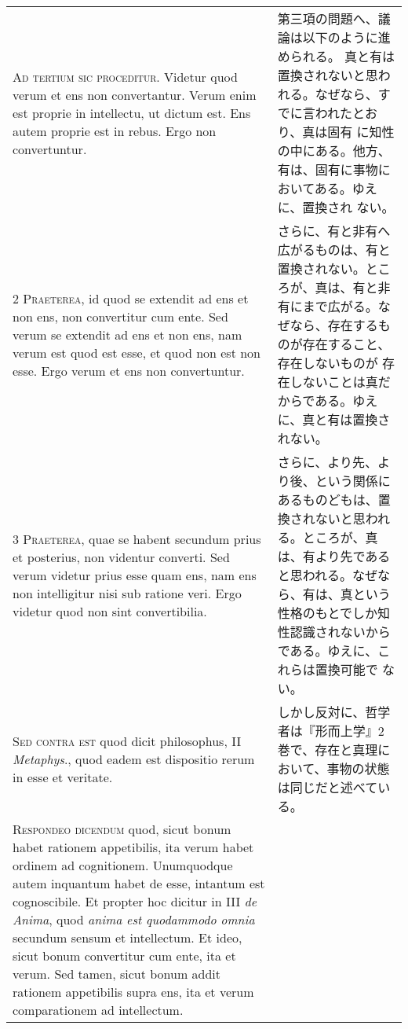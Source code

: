 \documentclass[10pt]{jsarticle} %
\begin{document}
\begin{longtable}{p{21em}p{21em}}



{\huge A}{\scshape d tertium sic proceditur}. Videtur quod verum et ens
non convertantur. Verum enim est proprie in intellectu, ut dictum
est. Ens autem proprie est in rebus. Ergo non convertuntur.

&

第三項の問題へ、議論は以下のように進められる。
真と有は置換されないと思われる。なぜなら、すでに言われたとおり、真は固有
 に知性の中にある。他方、有は、固有に事物においてある。ゆえに、置換され
 ない。

\\


{\scshape 2 Praeterea}, id quod se extendit ad ens et non ens, non
 convertitur cum ente. Sed verum se extendit ad ens et non ens, nam
 verum est quod est esse, et quod non est non esse. Ergo verum et ens
 non convertuntur.


&

さらに、有と非有へ広がるものは、有と置換されない。ところが、真は、有と非
 有にまで広がる。なぜなら、存在するものが存在すること、存在しないものが
 存在しないことは真だからである。ゆえに、真と有は置換されない。


\\


{\scshape 3 Praeterea}, quae se habent secundum prius et posterius, non
 videntur converti. Sed verum videtur prius esse quam ens, nam ens non
 intelligitur nisi sub ratione veri. Ergo videtur quod non sint
 convertibilia.


&

さらに、より先、より後、という関係にあるものどもは、置換されないと思われ
 る。ところが、真は、有より先であると思われる。なぜなら、有は、真という
 性格のもとでしか知性認識されないからである。ゆえに、これらは置換可能で
 ない。

\\


{\scshape Sed contra est} quod dicit philosophus, II {\itshape
 Metaphys}., quod eadem est dispositio rerum in esse et veritate.


&

しかし反対に、哲学者は『形而上学』2巻で、存在と真理において、事物の状態
 は同じだと述べている。

\\


{\scshape Respondeo dicendum} quod, sicut bonum habet rationem
 appetibilis, ita verum habet ordinem ad cognitionem. Unumquodque autem
 inquantum habet de esse, intantum est cognoscibile. Et propter hoc
 dicitur in III {\itshape de Anima}, quod {\itshape anima est quodammodo
 omnia} secundum sensum et intellectum. Et ideo, sicut bonum convertitur
 cum ente, ita et verum. Sed tamen, sicut bonum addit rationem
 appetibilis supra ens, ita et verum comparationem ad intellectum.



\end{longtable}
\end{document}
